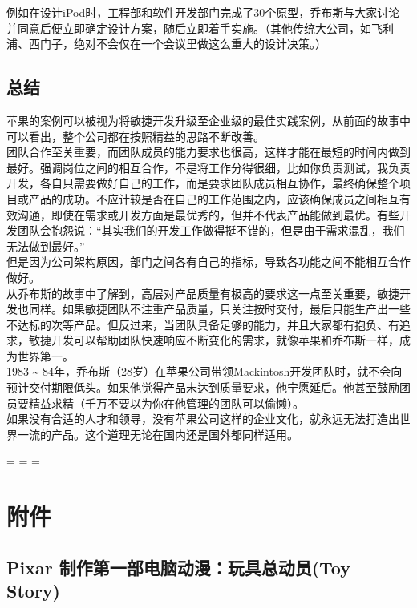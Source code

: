 例如在设计iPod时，工程部和软件开发部门完成了30个原型，乔布斯与大家讨论并同意后便立即确定设计方案，随后立即着手实施。（其他传统大公司，如飞利浦、西门子，绝对不会仅在一个会议里做这么重大的设计决策。）

\hypertarget{ux603bux7ed3}{%
\subsection{总结}\label{ux603bux7ed3}}

苹果的案例可以被视为将敏捷开发升级至企业级的最佳实践案例，从前面的故事中可以看出，整个公司都在按照精益的思路不断改善。\\
团队合作至关重要，而团队成员的能力要求也很高，这样才能在最短的时间内做到最好。强调岗位之间的相互合作，不是将工作分得很细，比如你负责测试，我负责开发，各自只需要做好自己的工作，而是要求团队成员相互协作，最终确保整个项目或产品的成功。不应计较是否在自己的工作范围之内，应该确保成员之间相互有效沟通，即使在需求或开发方面是最优秀的，但并不代表产品能做到最优。有些开发团队会抱怨说：``其实我们的开发工作做得挺不错的，但是由于需求混乱，我们无法做到最好。''\\
但是因为公司架构原因，部门之间各有自己的指标，导致各功能之间不能相互合作做好。\\
从乔布斯的故事中了解到，高层对产品质量有极高的要求这一点至关重要，敏捷开发也同样。如果敏捷团队不注重产品质量，只关注按时交付，最后只能生产出一些不达标的次等产品。但反过来，当团队具备足够的能力，并且大家都有抱负、有追求，敏捷开发可以帮助团队快速响应不断变化的需求，就像苹果和乔布斯一样，成为世界第一。\\
1983 \textasciitilde{}
84年，乔布斯（28岁）在苹果公司带领Mackintosh开发团队时，就不会向预计交付期限低头。如果他觉得产品未达到质量要求，他宁愿延后。他甚至鼓励团员要精益求精（千万不要以为你在他管理的团队可以偷懒）。\\
如果没有合适的人才和领导，没有苹果公司这样的企业文化，就永远无法打造出世界一流的产品。这个道理无论在国内还是国外都同样适用。

\begin{description}
\tightlist
\item[]
= = =
\end{description}

\hypertarget{ux9644ux4ef6}{%
\section{附件}\label{ux9644ux4ef6}}

\hypertarget{pixar-ux5236ux4f5cux7b2cux4e00ux90e8ux7535ux8111ux52a8ux6f2bux73a9ux5177ux603bux52a8ux5458toy-story}{%
\subsection{Pixar 制作第一部电脑动漫：玩具总动员(Toy
Story)}\label{pixar-ux5236ux4f5cux7b2cux4e00ux90e8ux7535ux8111ux52a8ux6f2bux73a9ux5177ux603bux52a8ux5458toy-story}}

